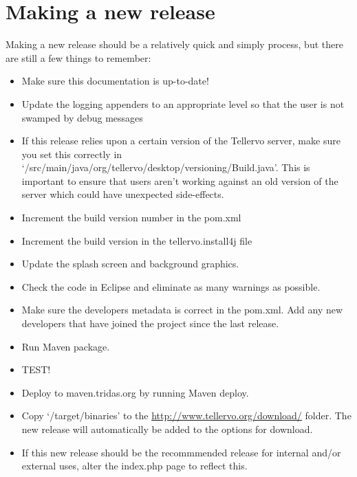 \section{Making a new release}
Making a new release should be a relatively quick and simply process, but there are still a few things to remember:

\begin{itemize}
 \item Make sure this documentation is up-to-date!  
 \item Update the logging appenders to an appropriate level so that the user is not swamped by debug messages
 \item If this release relies upon a certain version of the Tellervo server, make sure you set this correctly in `/src/main/java/org/tellervo/desktop/versioning/Build.java'.  This is important to ensure that users aren't working against an old version of the server which could have unexpected side-effects.
 \item Increment the build version number in the pom.xml
 \item Increment the build version in the tellervo.install4j file
 \item Update the splash screen and background graphics.
 \item Check the code in Eclipse and eliminate as many warnings as possible.
 \item Make sure the developers metadata is correct in the pom.xml.  Add any new developers that have joined the project since the last release.
 \item Run Maven package.
 \item TEST!
 \item Deploy to maven.tridas.org by running Maven deploy.
 \item Copy `/target/binaries' to the \url{http://www.tellervo.org/download/} folder.  The new release will automatically be added to the options for download.
 \item If this new release should be the recommmended release for internal and/or external uses, alter the index.php page to reflect this.
\end{itemize}


